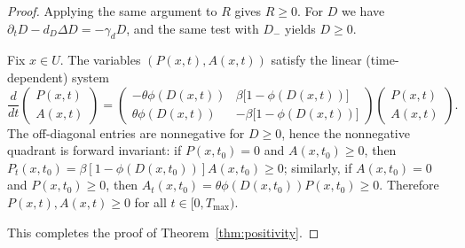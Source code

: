 \documentclass[pdflatex,sn-mathphys-ay]{sn-jnl}
\theoremstyle{thmstyleone}
\theoremstyle{definition}
\theoremstyle{remark}
\begin{document}
\begin{proof}
Applying the same argument to $R$ gives $R\ge 0$.
For $D$ we have $\partial_tD-d_D\Delta D=-\gamma_d D$, and the same test with $D_-$ yields $D\ge 0$.

Fix $x\in U$. The variables $(P(x,t),A(x,t))$ satisfy the linear (time-dependent) system
\[
\frac{d}{dt}\begin{pmatrix}
    P(x,t)\\[4pt]
    A(x,t)
\end{pmatrix}
=
\begin{pmatrix}
-\theta\phi(D(x,t)) & \beta\bigl[1-\phi(D(x,t))\bigr]\\[4pt]
\theta\phi(D(x,t)) & -\beta\bigl[1-\phi(D(x,t))\bigr]
\end{pmatrix}
\begin{pmatrix}
    P(x,t)\\[4pt]
    A(x,t)
\end{pmatrix}.
\]
The off-diagonal entries are nonnegative for $D\ge 0$, hence the nonnegative quadrant is forward invariant:
if $P(x,t_0)=0$ and $A(x,t_0)\ge 0$, then
$P_t(x,t_0)=\beta[1-\phi(D(x,t_0))]A(x,t_0)\ge 0$; similarly, if $A(x,t_0)=0$ and $P(x,t_0)\ge 0$, then
$A_t(x,t_0)=\theta\phi(D(x,t_0))P(x,t_0)\ge 0$.
Therefore $P(x,t),A(x,t)\ge 0$ for all $t\in[0,T_{\max})$.

This completes the proof of Theorem~\ref{thm:positivity}.
\end{proof}
\end{document}
